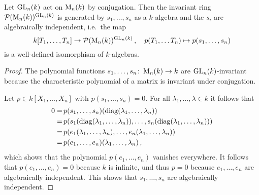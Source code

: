 \begin{theorem}
  \label{theorem: GLn invariants for conjugation}
  Let $\operatorname{GL}_n(k)$ act on $\operatorname{M}_n(k)$ by conjugation.
  Then the invariant ring $\mathcal{P}(\operatorname{M}_n(k))^{\operatorname{GL}_n(k)}$ is generated by $s_1, \dotsc, s_n$ as a $k$-algebra and the $s_i$ are algebraically independent, i.e.\ the map
  \[
            k[T_1, \dotsc, T_n]
    \to     \mathcal{P}(\operatorname{M}_n(k))^{\operatorname{GL}_n(k)} \,,
    \quad   p(T_1, \dotsc T_n)
    \mapsto p(s_1, \dotsc, s_n)
  \]
  is a well-defined isomorphism of $k$-algebras.
\end{theorem}
\begin{proof}
  The polynomial functions $s_1, \dotsc, s_n \colon \operatorname{M}_n(k) \to k$ are $\operatorname{GL}_n(k)$-invariant because the characteristic polynomial of a matrix is invariant under conjugation.
  
  Let $p \in k[X_1, \dotsc, X_n]$ with $p(s_1, \dotsc, s_n) = 0$.
  For all $\lambda_1, \dotsc, \lambda \in k$ it follows that
  \begin{align*}
          0
    =&\,  p(s_1, \dotsc, s_n)( \operatorname{diag}(\lambda_1, \dotsc, \lambda_n) )  \\
    =&\,  p( s_1(\operatorname{diag}(\lambda_1, \dotsc, \lambda_n)), \dotsc, s_n(\operatorname{diag}(\lambda_1, \dotsc, \lambda_n)) ) \\
    =&\,  p( e_1(\lambda_1, \dotsc, \lambda_n) , \dotsc, e_n(\lambda_1, \dotsc, \lambda_n) )  \\
    =&\,  p(e_1, \dotsc, e_n)(\lambda_1, \dotsc, \lambda_n) \,,
  \end{align*}
  which shows that the polynomial $p(e_1, \dotsc, e_n)$ vanishes everywhere.
  It follows that $p(e_1, \dotsc, e_n) = 0$ because $k$ is infinite, und thus $p = 0$ because $e_1, \dotsc, e_n$ are algebraically independent.
  This shows that $s_1, \dotsc, s_n$ are algebraically independent.
  

\end{proof}

